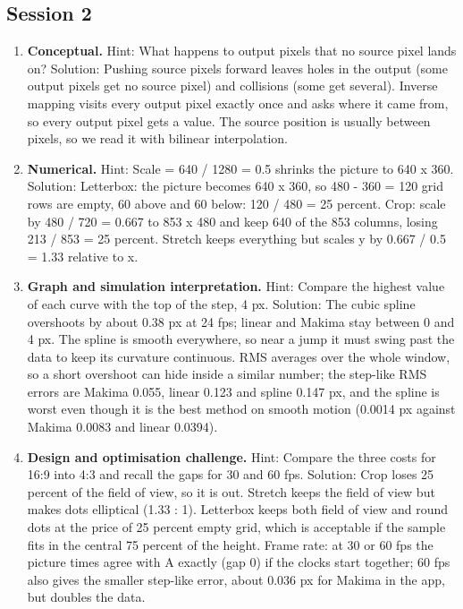 \documentclass[11pt,a4paper]{article}
\begin{document}
\subsection*{Session 2}
\begin{enumerate}[nosep]
\item \textbf{Conceptual.} Hint: What happens to output pixels that no source pixel lands on? Solution: Pushing source pixels forward leaves holes in the output (some output pixels get no source pixel) and collisions (some get several). Inverse mapping visits every output pixel exactly once and asks where it came from, so every output pixel gets a value. The source position is usually between pixels, so we read it with bilinear interpolation.
\item \textbf{Numerical.} Hint: Scale = 640 / 1280 = 0.5 shrinks the picture to 640 x 360. Solution: Letterbox: the picture becomes 640 x 360, so 480 - 360 = 120 grid rows are empty, 60 above and 60 below: 120 / 480 = 25 percent. Crop: scale by 480 / 720 = 0.667 to 853 x 480 and keep 640 of the 853 columns, losing 213 / 853 = 25 percent. Stretch keeps everything but scales y by 0.667 / 0.5 = 1.33 relative to x.
\item \textbf{Graph and simulation interpretation.} Hint: Compare the highest value of each curve with the top of the step, 4 px. Solution: The cubic spline overshoots by about 0.38 px at 24 fps; linear and Makima stay between 0 and 4 px. The spline is smooth everywhere, so near a jump it must swing past the data to keep its curvature continuous. RMS averages over the whole window, so a short overshoot can hide inside a similar number; the step-like RMS errors are Makima 0.055, linear 0.123 and spline 0.147 px, and the spline is worst even though it is the best method on smooth motion (0.0014 px against Makima 0.0083 and linear 0.0394).
\item \textbf{Design and optimisation challenge.} Hint: Compare the three costs for 16:9 into 4:3 and recall the gaps for 30 and 60 fps. Solution: Crop loses 25 percent of the field of view, so it is out. Stretch keeps the field of view but makes dots elliptical (1.33 : 1). Letterbox keeps both field of view and round dots at the price of 25 percent empty grid, which is acceptable if the sample fits in the central 75 percent of the height. Frame rate: at 30 or 60 fps the picture times agree with A exactly (gap 0) if the clocks start together; 60 fps also gives the smaller step-like error, about 0.036 px for Makima in the app, but doubles the data.
\end{enumerate}
\end{document}
